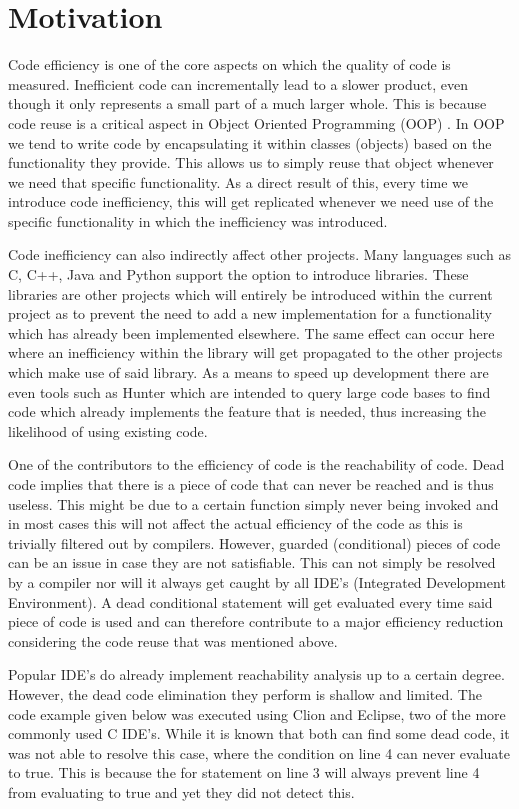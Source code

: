 \documentclass[12pt]{thesis}
\begin{document}
\chapter{Motivation}
Code efficiency is one of the core aspects on which the quality of code is measured. Inefficient code can incrementally lead to a slower product, even though it only represents a small part of a much larger whole. This is because code reuse is a critical aspect in Object Oriented Programming (OOP) \cite{10.1145/71605.71612}. In OOP we tend to write code by encapsulating it within classes (objects) based on the functionality they provide. This allows us to simply reuse that object whenever we need that specific functionality. As a direct result of this, every time we introduce code inefficiency, this will get replicated whenever we need use of the specific functionality in which the inefficiency was introduced.

Code inefficiency can also indirectly affect other projects. Many languages such as C, C++, Java and Python support the option to introduce libraries. These libraries are other projects which will entirely be introduced within the current project as to prevent the need to add a new implementation for a functionality which has already been implemented elsewhere. The same effect can occur here where an inefficiency within the library will get propagated to the other projects which make use of said library. As a means to speed up development there are even tools such as Hunter \cite{10.1145/2950290.2983934} which are intended to query large code bases to find code which already implements the feature that is needed, thus increasing the likelihood of using existing code.

One of the contributors to the efficiency of code is the reachability of code. Dead code implies that there is a piece of code that can never be reached and is thus useless. This might be due to a certain function simply never being invoked and in most cases this will not affect the actual efficiency of the code as this is trivially filtered out by compilers. However, guarded (conditional) pieces of code can be an issue in case they are not satisfiable. This can not simply be resolved by a compiler nor will it always get caught by all IDE's (Integrated Development Environment). A dead conditional statement will get evaluated every time said piece of code is used and can therefore contribute to a major efficiency reduction considering the code reuse that was mentioned above.

Popular IDE's do already implement reachability analysis up to a certain degree. However, the dead code elimination they perform is shallow and limited. The code example given below was executed using Clion and Eclipse, two of the more commonly used C IDE's. While it is known that both can find some dead code, it was not able to resolve this case, where the condition on line 4 can never evaluate to true. This is because the for statement on line 3 will always prevent line 4 from evaluating to true and yet they did not detect this.
\end{document}
